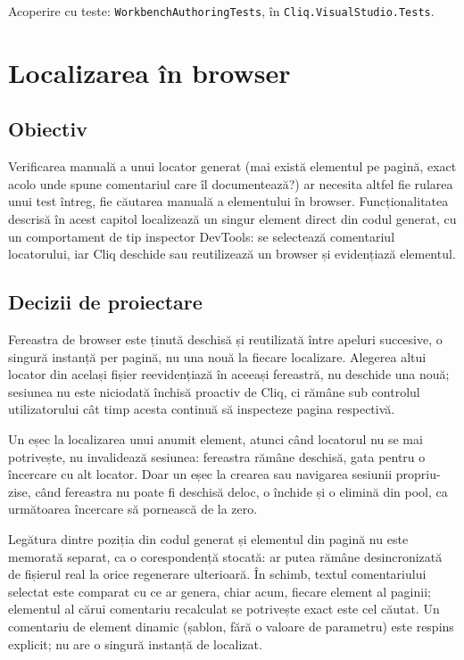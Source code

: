 \documentclass[12pt,a4paper]{report}
\newcommand{\File}[1]{\nolinkurl{#1}}
\begin{document}
Acoperire cu teste: \File{WorkbenchAuthoringTests}, în \File{Cliq.VisualStudio.Tests}.

\chapter{Localizarea în browser}

\section{Obiectiv}

Verificarea manuală a unui locator generat (mai există elementul pe pagină, exact acolo unde spune comentariul care îl documentează?) ar necesita altfel fie rularea unui test întreg, fie căutarea manuală a elementului în browser. Funcționalitatea descrisă în acest capitol localizează un singur element direct din codul generat, cu un comportament de tip inspector DevTools: se selectează comentariul locatorului, iar Cliq deschide sau reutilizează un browser și evidențiază elementul.

\section{Decizii de proiectare}

Fereastra de browser este ținută deschisă și reutilizată între apeluri succesive, o singură instanță per pagină, nu una nouă la fiecare localizare. Alegerea altui locator din același fișier reevidențiază în aceeași fereastră, nu deschide una nouă; sesiunea nu este niciodată închisă proactiv de Cliq, ci rămâne sub controlul utilizatorului cât timp acesta continuă să inspecteze pagina respectivă.

Un eșec la localizarea unui anumit element, atunci când locatorul nu se mai potrivește, nu invalidează sesiunea: fereastra rămâne deschisă, gata pentru o încercare cu alt locator. Doar un eșec la crearea sau navigarea sesiunii propriu-zise, când fereastra nu poate fi deschisă deloc, o închide și o elimină din pool, ca următoarea încercare să pornească de la zero.

Legătura dintre poziția din codul generat și elementul din pagină nu este memorată separat, ca o corespondență stocată: ar putea rămâne desincronizată de fișierul real la orice regenerare ulterioară. În schimb, textul comentariului selectat este comparat cu ce ar genera, chiar acum, fiecare element al paginii; elementul al cărui comentariu recalculat se potrivește exact este cel căutat. Un comentariu de element dinamic (șablon, fără o valoare de parametru) este respins explicit; nu are o singură instanță de localizat.
\end{document}
